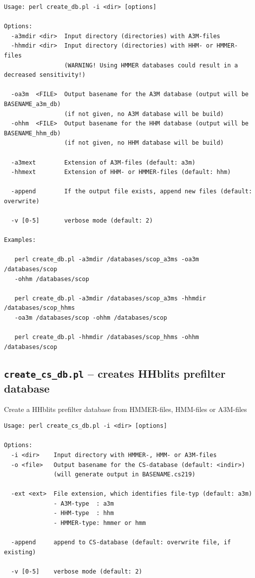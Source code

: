 \documentclass[11pt,a4paper]{article}
\begin{document}
\small \begin{verbatim}
Usage: perl create_db.pl -i <dir> [options]

Options:
  -a3mdir <dir>  Input directory (directories) with A3M-files
  -hhmdir <dir>  Input directory (directories) with HHM- or HMMER-files 
                 (WARNING! Using HMMER databases could result in a decreased sensitivity!)

  -oa3m  <FILE>  Output basename for the A3M database (output will be BASENAME_a3m_db)
                 (if not given, no A3M database will be build)
  -ohhm  <FILE>  Output basename for the HHM database (output will be BASENAME_hhm_db)
                 (if not given, no HHM database will be build)

  -a3mext        Extension of A3M-files (default: a3m)
  -hhmext        Extension of HHM- or HMMER-files (default: hhm)

  -append        If the output file exists, append new files (default: overwrite)

  -v [0-5]       verbose mode (default: 2)

Examples:

   perl create_db.pl -a3mdir /databases/scop_a3ms -oa3m /databases/scop 
   -ohhm /databases/scop

   perl create_db.pl -a3mdir /databases/scop_a3ms -hhmdir /databases/scop_hhms 
   -oa3m /databases/scop -ohhm /databases/scop

   perl create_db.pl -hhmdir /databases/scop_hhms -ohhm /databases/scop
\end{verbatim} \normalsize

\subsection{{\tt create\_cs\_db.pl} -- creates HHblits prefilter database}

Create a HHblits prefilter database from HMMER-files, HMM-files or A3M-files

\small \begin{verbatim}
Usage: perl create_cs_db.pl -i <dir> [options]

Options:
  -i <dir>    Input directory with HMMER-, HMM- or A3M-files
  -o <file>   Output basename for the CS-database (default: <indir>)
              (will generate output in BASENAME.cs219)

  -ext <ext>  File extension, which identifies file-typ (default: a3m)
              - A3M-type  : a3m
              - HHM-type  : hhm
              - HMMER-type: hmmer or hmm

  -append     append to CS-database (default: overwrite file, if existing)

  -v [0-5]    verbose mode (default: 2)
\end{verbatim} \normalsize
\end{document}
